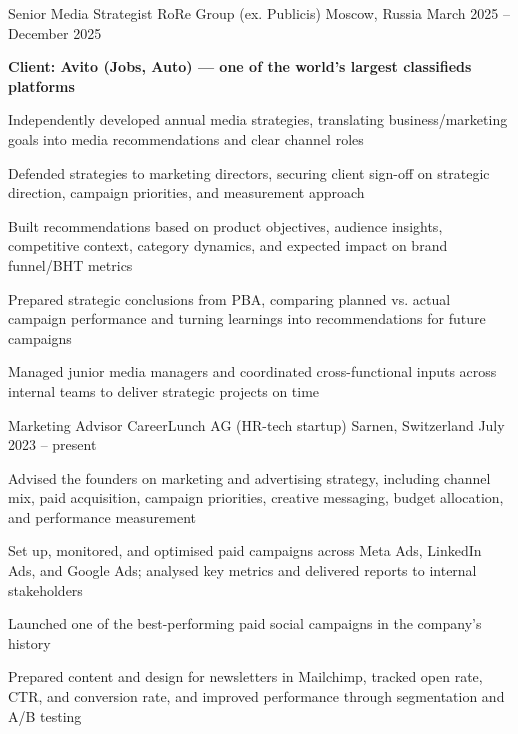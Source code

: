 \documentclass[11pt, a4paper]{awesome-cv}
\begin{document}
\begin{cventries}

\cventry
	{Senior Media Strategist}
	{RoRe Group (ex. Publicis)}
	{Moscow, Russia}
	{March 2025 -- December 2025}
	{
		\begin{cvitems}
			\item[] {\bf Client: Avito (Jobs, Auto) --- one of the world’s largest classifieds platforms}
			\item {Independently developed annual media strategies, translating business/marketing goals into media recommendations and clear channel roles}
			\item {Defended strategies to marketing directors, securing client sign-off on strategic direction, campaign priorities, and measurement approach}
			\item {Built recommendations based on product objectives, audience insights, competitive context, category dynamics, and expected impact on brand funnel/BHT metrics}
			\item {Prepared strategic conclusions from PBA, comparing planned vs. actual campaign performance and turning learnings into recommendations for future campaigns}
			\item {Managed junior media managers and coordinated cross-functional inputs across internal teams to deliver strategic projects on time}
		\end{cvitems}
	}

\cventry
	{Marketing Advisor}
	{CareerLunch AG (HR-tech startup)}
	{Sarnen, Switzerland}
	{July 2023 -- present}
	{
		\begin{cvitems}                                                                                                                                                                                                      
			\item {Advised the founders on marketing and advertising strategy, including channel mix, paid acquisition, campaign priorities, creative messaging, budget allocation, and performance measurement}               
			\item {Set up, monitored, and optimised paid campaigns across Meta Ads, LinkedIn Ads, and Google Ads; analysed key metrics and delivered reports to internal stakeholders}                                         
			\item {Launched one of the best-performing paid social campaigns in the company’s history}                                                                                                                         
			\item {Prepared content and design for newsletters in Mailchimp, tracked open rate, CTR, and conversion rate, and improved performance through segmentation and A/B testing}                                            
		\end{cvitems}
	}


\end{cventries}
\end{document}
